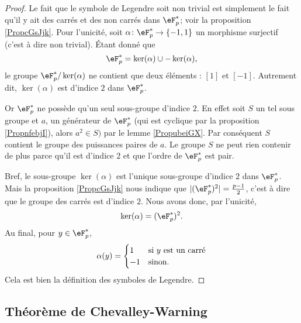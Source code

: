 \begin{proof}
    Le fait que le symbole de Legendre soit non trivial est simplement le fait qu'il y ait des carrés et des non carrés dans \( \eF_p^*\); voir la proposition \ref{PropcGsJjk}. Pour l'unicité, soit \( \alpha\colon \eF^*_p\to \{ -1,1 \}\) un morphisme surjectif (c'est à dire non trivial). Étant donné que 
    \begin{equation}
        \eF^*_p=\ker(\alpha)\cup-\ker(\alpha),
    \end{equation}
    le groupe \( \eF_p^*/\ker(\alpha)\) ne contient que deux éléments : \( [1]\) et \( [-1]\). Autrement dit, \( \ker(\alpha)\) est d'indice \( 2\) dans \( \eF_p^*\). 
    
    Or \( \eF_p^*\) ne possède qu'un seul sous-groupe d'indice \( 2\). En effet soit \( S\) un tel sous groupe et \( a\), un générateur de \( \eF_p^*\) (qui est cyclique par la proposition \ref{PropnfebjI}), alors \( a^2\in S)\) par le lemme \ref{PropubeiGX}. Par conséquent \( S\) contient le groupe des puissances paires de \( a\). Le groupe $S$ ne peut rien contenir de plus parce qu'il est d'indice \( 2\) et que l'ordre de \( \eF_p^*\) est pair.

    Bref, le sous-groupe \( \ker(\alpha)\) est l'unique sous-groupe d'indice \( 2\) dans \( \eF_p^*\). Mais la proposition \ref{PropcGsJjk} nous indique que \( | (\eF_p^*)^2 |=\frac{ p-1 }{2}\), c'est à dire que le groupe des carrés est d'indice \( 2\). Nous avons donc, par l'unicité,
    \begin{equation}
        \ker(\alpha)=(\eF_p^*)^2.
    \end{equation}
    Au final, pour \( y\in \eF_p^*\),
    \begin{equation}
        \alpha(y)=\begin{cases}
           1 &   \text{si \( y\) est un carré}\\
            -1    &    \text{sinon.}
        \end{cases}
    \end{equation}
    Cela est bien la définition des symboles de Legendre.
\end{proof}
 

\subsection{Théorème de Chevalley-Warning}

